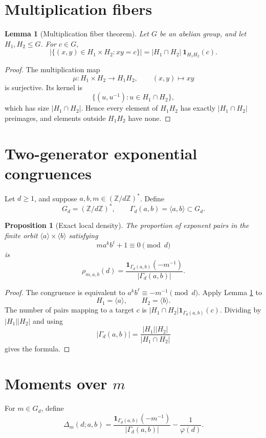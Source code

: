 \documentclass[11pt]{article}
\newtheorem{proposition}{Proposition}
\newtheorem{lemma}{Lemma}
\newcommand{\Z}{\mathbb Z}
\newcommand{\1}{\mathbf 1}
\begin{document}
\section{Multiplication fibers}

\begin{lemma}[Multiplication fiber theorem]\label{L:fiber}
Let \(G\) be an abelian group, and let \(H_1,H_2\le G\).  For \(c\in G\),
\[
|\{(x,y)\in H_1\times H_2:xy=c\}|
=
|H_1\cap H_2|\ \1_{H_1H_2}(c).
\]
\end{lemma}

\begin{proof}
The multiplication map
\[
\mu:H_1\times H_2\to H_1H_2,\qquad (x,y)\mapsto xy
\]
is surjective.  Its kernel is
\[
\{(u,u^{-1}):u\in H_1\cap H_2\},
\]
which has size \(|H_1\cap H_2|\).  Hence every element of \(H_1H_2\) has exactly \(|H_1\cap H_2|\) preimages, and elements outside \(H_1H_2\) have none.
\end{proof}

\section{Two-generator exponential congruences}

Let \(d\ge1\), and suppose \(a,b,m\in(\Z/d\Z)^*\).  Define
\[
G_d=(\Z/d\Z)^*,\qquad \Gamma_d(a,b)=\langle a,b\rangle\subset G_d.
\]

\begin{proposition}[Exact local density]\label{P:localdensity}
The proportion of exponent pairs in the finite orbit \(\langle a\rangle\times\langle b\rangle\) satisfying
\[
m a^k b^\ell+1\equiv0\pmod d
\]
is
\[
\rho_{m,a,b}(d)=
\frac{\1_{\Gamma_d(a,b)}(-m^{-1})}{|\Gamma_d(a,b)|}.
\]
\end{proposition}

\begin{proof}
The congruence is equivalent to \(a^k b^\ell\equiv -m^{-1}\pmod d\).  Apply Lemma \ref{L:fiber} to
\[
H_1=\langle a\rangle,\qquad H_2=\langle b\rangle.
\]
The number of pairs mapping to a target \(c\) is \(|H_1\cap H_2|\1_{\Gamma_d(a,b)}(c)\).  Dividing by \(|H_1||H_2|\) and using
\[
|\Gamma_d(a,b)|=\frac{|H_1||H_2|}{|H_1\cap H_2|}
\]
gives the formula.
\end{proof}

\section{Moments over \(m\)}

For \(m\in G_d\), define
\[
\Delta_m(d;a,b)=
\frac{\1_{\Gamma_d(a,b)}(-m^{-1})}{|\Gamma_d(a,b)|}
-
\frac1{\varphi(d)}.
\]
\end{document}
